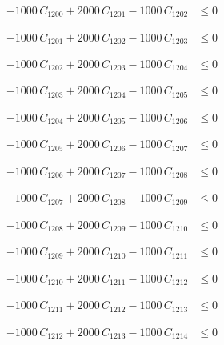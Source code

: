 \documentclass[a4paper,11pt]{article}
\begin{document}
\begin{align}
-1000\,C_{1200} + 2000\,C_{1201} - 1000\,C_{1202} &\leq 0 \nonumber
\end{align}

\begin{align}
-1000\,C_{1201} + 2000\,C_{1202} - 1000\,C_{1203} &\leq 0 \nonumber
\end{align}

\begin{align}
-1000\,C_{1202} + 2000\,C_{1203} - 1000\,C_{1204} &\leq 0 \nonumber
\end{align}

\begin{align}
-1000\,C_{1203} + 2000\,C_{1204} - 1000\,C_{1205} &\leq 0 \nonumber
\end{align}

\begin{align}
-1000\,C_{1204} + 2000\,C_{1205} - 1000\,C_{1206} &\leq 0 \nonumber
\end{align}

\begin{align}
-1000\,C_{1205} + 2000\,C_{1206} - 1000\,C_{1207} &\leq 0 \nonumber
\end{align}

\begin{align}
-1000\,C_{1206} + 2000\,C_{1207} - 1000\,C_{1208} &\leq 0 \nonumber
\end{align}

\begin{align}
-1000\,C_{1207} + 2000\,C_{1208} - 1000\,C_{1209} &\leq 0 \nonumber
\end{align}

\begin{align}
-1000\,C_{1208} + 2000\,C_{1209} - 1000\,C_{1210} &\leq 0 \nonumber
\end{align}

\begin{align}
-1000\,C_{1209} + 2000\,C_{1210} - 1000\,C_{1211} &\leq 0 \nonumber
\end{align}

\begin{align}
-1000\,C_{1210} + 2000\,C_{1211} - 1000\,C_{1212} &\leq 0 \nonumber
\end{align}

\begin{align}
-1000\,C_{1211} + 2000\,C_{1212} - 1000\,C_{1213} &\leq 0 \nonumber
\end{align}

\begin{align}
-1000\,C_{1212} + 2000\,C_{1213} - 1000\,C_{1214} &\leq 0 \nonumber
\end{align}
\end{document}

